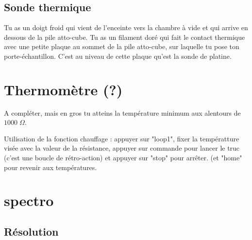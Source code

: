 \documentclass[a4paper]{report}
\begin{document}
  \subsection{Sonde thermique}
  Tu as un doigt froid qui vient de l'enceinte vers la chambre à vide et qui arrive en dessous de la pile atto-cube. Tu as un filament doré qui fait le contact thermique avec une petite plaque au sommet de la pile atto-cube, sur laquelle tu pose ton porte-échantillon. C'est au niveau de cette plaque qu'est la sonde de platine.
 \section{Thermomètre (?)}
 A compléter, mais en gros tu atteins la température minimum aux alentours de $1000 \; \Omega$.
 
 Utilisation de la fonction chauffage : appuyer sur "loop1", fixer la températture visée avec la valeur de la résistance, appuyer sur commande pour lancer le truc (c'est une boucle de rétro-action) et appuyer sur "stop" pour arrêter. (et "home" pour revenir aux températures.
 \section{spectro}
 \subsection{Résolution}
 
  
\end{document}
